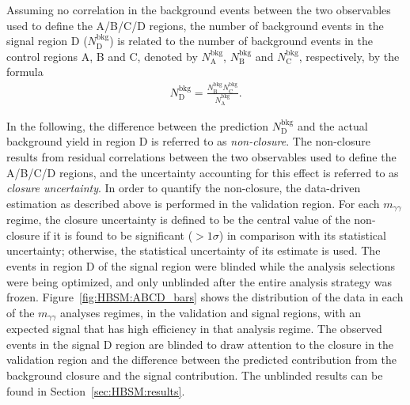 Assuming no correlation in the background events between the two observables used to define the A/B/C/D regions,
the number of background events in the signal region D ($N^\text{bkg}_\text{D}$) is related to the number
of background events in the control regions A, B and C, denoted by $N^\text{bkg}_\text{A}$, $N^\text{bkg}_\text{B}$
and $N^\text{bkg}_\text{C}$, respectively, by the formula
\begin{align}
N^\text{bkg}_\text{D} = \frac{N^\text{bkg}_\text{B}N^\text{bkg}_\text{C}}{N^\text{bkg}_\text{A}}.
\label{eqn:HBSM:closure}
\end{align}

In the following, the difference between the prediction $N^\text{bkg}_\text{D}$ and the actual background yield in region D 
is referred to as \textit{non-closure}.
The non-closure results from residual correlations between the two observables used to define the A/B/C/D regions,
and the uncertainty accounting for this effect is referred to as \textit{closure uncertainty}.
In order to quantify the non-closure, the data-driven estimation as described above is performed 
in the validation region.
For each $m_{\gamma\gamma}$ regime, the closure uncertainty is defined to be the central value of the non-closure if it is found to be significant ($>1\sigma$) in comparison with its statistical uncertainty; otherwise, the statistical uncertainty of its estimate is used.
The events in region D of the signal region were blinded while the analysis selections were being optimized, and only unblinded after the entire analysis strategy was frozen.
Figure~\ref{fig:HBSM:ABCD_bars} shows the distribution of the data in each of the $m_{\gamma\gamma}$ analyses regimes, in the validation and signal regions, with an expected signal that has high efficiency in that analysis regime.
The observed events in the signal D region are blinded to draw attention to the closure in the validation region and the difference between the predicted contribution from the background closure and the signal contribution.
The unblinded results can be found in Section~\ref{sec:HBSM:results}.

